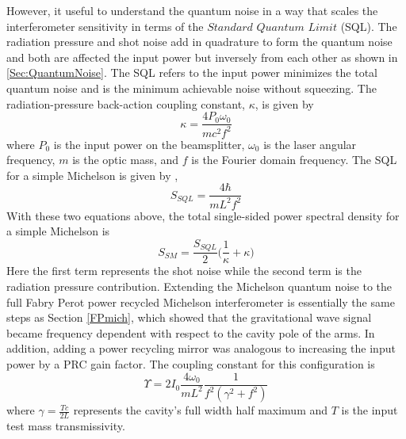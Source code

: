 	However, it useful to understand the quantum noise in a way that scales the interferometer sensitivity in terms of the $\textit{Standard Quantum Limit}$ (SQL).   The radiation pressure and shot noise add in quadrature to form the quantum noise and both are affected the input power but inversely from each other as shown in \ref{Sec:QuantumNoise}.  The SQL refers to the input power minimizes the total quantum noise and is the minimum achievable noise without squeezing.  The radiation-pressure back-action coupling constant, $\kappa$, is given by \cite{KimbleConversion}
	\begin{equation}
	\kappa = \frac{4 P_0 \omega_{0}}{m c^2 f^2}
	\end{equation}
	where $P_0$ is the input power on the beamsplitter, $\omega_{0}$ is the laser angular frequency, $m$ is the optic mass, and $f$ is the Fourier domain frequency.  The SQL for a simple Michelson is given by \cite{KimbleConversion},
	\begin{equation}
	S_{SQL} = \frac{4 \hbar}{m L^2 f^2}
	\end{equation}
	With these two equations above, the total single-sided power spectral density for a simple Michelson is
	\begin{equation}
	S_{SM} = \frac{S_{SQL}}{2} \bigg( \frac{1}{\kappa}  + \kappa\bigg)
	\end{equation}
	Here the first term represents the shot noise while the second term is the radiation pressure contribution.  Extending the Michelson quantum noise to the full Fabry Perot power recycled Michelson interferometer is essentially the same steps as Section \ref{FPmich}, which showed that the gravitational wave signal became frequency dependent with respect to the cavity pole of the arms.  In addition, adding a power recycling mirror was analogous to increasing the input power by a PRC gain factor.  The coupling constant for this configuration is
	\begin{equation}
	\Upsilon = 2 I_0 \frac{4 \omega_{0}}{m L^2} \frac{1}{f^2 (\gamma^2 + f^2)}
	\end{equation}
	where $\gamma = \frac{T c}{2 L}$ represents the cavity's full width half maximum and $T$ is the input test mass transmissivity. 
	
